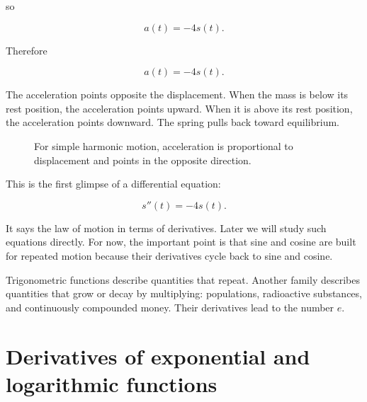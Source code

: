 so

\[
a(t)=-4s(t).
\]

Therefore

\[
\boxed{
a(t)=-4s(t).
}
\]

The acceleration points opposite the displacement.  When the mass is below its rest position, the acceleration points upward.  When it is above its rest position, the acceleration points downward.  The spring pulls back toward equilibrium.

\begin{figure}[h]
\centering
{}
\caption{For simple harmonic motion, acceleration is proportional to displacement and points in the opposite direction.}
\label{fig:simple-harmonic-motion-preview}
\end{figure}

This is the first glimpse of a differential equation:

\[
s''(t)=-4s(t).
\]

It says the law of motion in terms of derivatives.  Later we will study such equations directly.  For now, the important point is that sine and cosine are built for repeated motion because their derivatives cycle back to sine and cosine.

Trigonometric functions describe quantities that repeat.  Another family describes quantities that grow or decay by multiplying: populations, radioactive substances, and continuously compounded money.  Their derivatives lead to the number \(e\).

\section{Derivatives of exponential and logarithmic functions}
\label{sec:derivatives-exponential-logarithmic}

